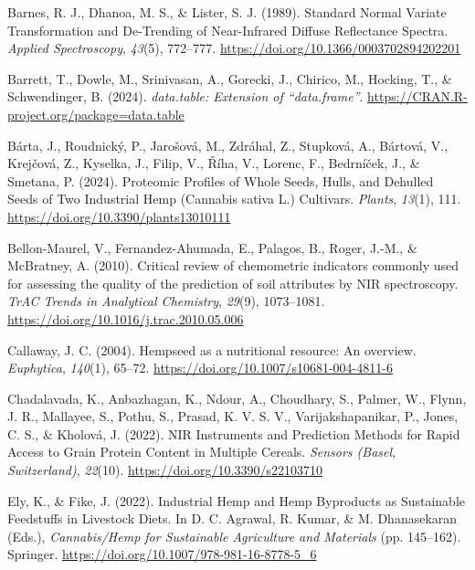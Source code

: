 \documentclass[
]{agujournal2019}
\newlength{\cslhangindent}
\newenvironment{CSLReferences}[2] %
 {\begin{list}{}{%
  \setlength{\itemindent}{0pt}
  \setlength{\leftmargin}{0pt}
  \setlength{\parsep}{0pt}
  \ifodd #1
   \setlength{\leftmargin}{\cslhangindent}
   \setlength{\itemindent}{-1\cslhangindent}
  \fi
  \setlength{\itemsep}{#2\baselineskip}}}
 {\end{list}}
\begin{document}
\label{refs}
\begin{CSLReferences}{1}{0}
Barnes, R. J., Dhanoa, M. S., \& Lister, S. J. (1989). Standard {Normal}
{Variate} {Transformation} and {De}-{Trending} of {Near}-{Infrared}
{Diffuse} {Reflectance} {Spectra}. \emph{Applied Spectroscopy},
\emph{43}(5), 772--777. \url{https://doi.org/10.1366/0003702894202201}

Barrett, T., Dowle, M., Srinivasan, A., Gorecki, J., Chirico, M.,
Hocking, T., \& Schwendinger, B. (2024). \emph{{data.table}: Extension
of {``{data.frame}''}}.
\url{https://CRAN.R-project.org/package=data.table}

Bárta, J., Roudnický, P., Jarošová, M., Zdráhal, Z., Stupková, A.,
Bártová, V., Krejčová, Z., Kyselka, J., Filip, V., Říha, V., Lorenc, F.,
Bedrníček, J., \& Smetana, P. (2024). Proteomic {Profiles} of {Whole}
{Seeds}, {Hulls}, and {Dehulled} {Seeds} of {Two} {Industrial} {Hemp}
({Cannabis} sativa {L}.) {Cultivars}. \emph{Plants}, \emph{13}(1), 111.
\url{https://doi.org/10.3390/plants13010111}

Bellon-Maurel, V., Fernandez-Ahumada, E., Palagos, B., Roger, J.-M., \&
McBratney, A. (2010). Critical review of chemometric indicators commonly
used for assessing the quality of the prediction of soil attributes by
{NIR} spectroscopy. \emph{TrAC Trends in Analytical Chemistry},
\emph{29}(9), 1073--1081.
\url{https://doi.org/10.1016/j.trac.2010.05.006}

Callaway, J. C. (2004). Hempseed as a nutritional resource: {An}
overview. \emph{Euphytica}, \emph{140}(1), 65--72.
\url{https://doi.org/10.1007/s10681-004-4811-6}

Chadalavada, K., Anbazhagan, K., Ndour, A., Choudhary, S., Palmer, W.,
Flynn, J. R., Mallayee, S., Pothu, S., Prasad, K. V. S. V.,
Varijakshapanikar, P., Jones, C. S., \& Kholová, J. (2022). {NIR}
{Instruments} and {Prediction} {Methods} for {Rapid} {Access} to {Grain}
{Protein} {Content} in {Multiple} {Cereals}. \emph{Sensors (Basel,
Switzerland)}, \emph{22}(10). \url{https://doi.org/10.3390/s22103710}

Ely, K., \& Fike, J. (2022). Industrial {Hemp} and {Hemp} {Byproducts}
as {Sustainable} {Feedstuffs} in {Livestock} {Diets}. In D. C. Agrawal,
R. Kumar, \& M. Dhanasekaran (Eds.), \emph{Cannabis/{Hemp} for
{Sustainable} {Agriculture} and {Materials}} (pp. 145--162). Springer.
\url{https://doi.org/10.1007/978-981-16-8778-5_6}


\end{CSLReferences}
\end{document}
